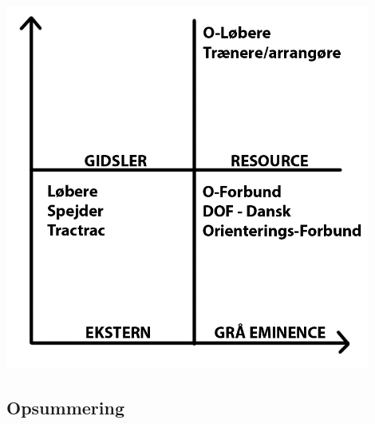 \includegraphics[width=0.90\textwidth]{billeder/Medvirken-indflydelse}
\vspace{4cm}

\subsection{Opsummering}


